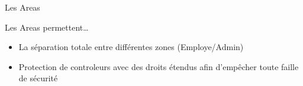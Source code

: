 \begin{frame}{Les Areas}

  Les Areas permettent\dots
  \begin{itemize}
  \item La séparation totale entre différentes zones (Employe/Admin)
  \item Protection de controleurs avec des droits étendus afin d'empêcher toute faille de sécurité
  \end{itemize}
\end{frame}